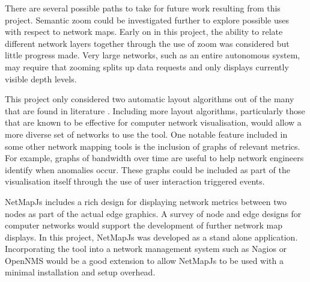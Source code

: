 \documentclass[11pt, a4paper]{report}
\begin{document}

There are several possible paths to take for future work resulting from this
project. Semantic zoom could be investigated further to explore possible uses
with respect to network maps. Early on in this project, the ability to relate
different network layers together through the use of zoom was considered but
little progress made. Very large networks, such as an entire autonomous system,
may require that zooming splits up data requests and only displays currently
visible depth levels. 

This project only considered two automatic layout algorithms out of the many
that are found in literature \cite{Battista_1994}. Including more layout
algorithms, particularly those that are known to be effective for computer
network visualisation, would allow a more diverse set of networks to use the
tool. One notable feature included in some other network mapping tools is the
inclusion of graphs of relevant metrics. For example, graphs of bandwidth over
time are useful to help network engineers identify when anomalies occur.  These
graphs could be included as part of the visualisation itself through the use of
user interaction triggered events.

NetMapJs includes a rich design for displaying network metrics between two nodes
as part of the actual edge graphics. A survey of node and edge designs for
computer networks would support the development of further network map displays.
In this project, NetMapJs was developed as a stand alone application.
Incorporating the tool into a network management system such as
Nagios \cite{Nagios_website} or OpenNMS \cite{OpenNMS_website} would be a good
extension to allow NetMapJs to be used with a minimal installation and setup
overhead.






\appendix
\appendixpage
\end{document}
